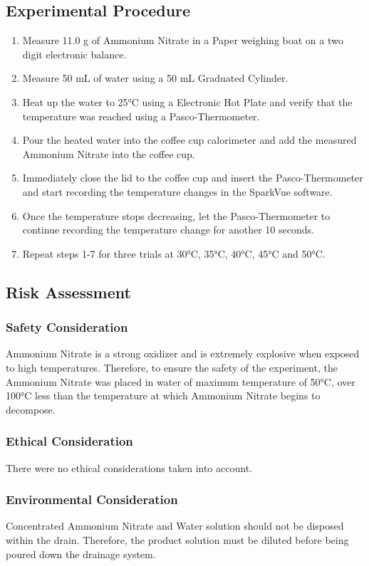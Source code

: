 \documentclass{article}
\begin{document}
\subsection{Experimental Procedure}
\begin{enumerate}
    \item Measure 11.0 g of Ammonium Nitrate in a Paper weighing boat on a two digit electronic balance. 
    \item Measure 50 mL of water using a 50 mL Graduated Cylinder.
    \item Heat up the water to 25°C using a Electronic Hot Plate and verify that the temperature was reached using a Pasco-Thermometer.
    \item Pour the heated water into the coffee cup calorimeter and add the measured Ammonium Nitrate into the coffee cup.
    \item Immediately close the lid to the coffee cup and insert the Pasco-Thermometer and start recording the temperature changes in the SparkVue software.
    \item Once the temperature stops decreasing, let the Pasco-Thermometer to continue recording the temperature change for another 10 seconds.
    \item Repeat steps 1-7 for three trials at 30°C, 35°C, 40°C, 45°C and 50°C.
\end{enumerate}

\subsection{Risk Assessment}
\subsubsection{Safety Consideration}
Ammonium Nitrate is a strong oxidizer and is extremely explosive when exposed to high temperatures. Therefore, to ensure the safety of the experiment, the Ammonium Nitrate was placed in water of maximum temperature of 50°C, over 100°C less than the temperature at which Ammonium Nitrate begins to decompose. 
\subsubsection{Ethical Consideration}
There were no ethical considerations taken into account.
\subsubsection{Environmental Consideration}
Concentrated Ammonium Nitrate and Water solution should not be disposed within the drain. Therefore, the product solution must be diluted before being poured down the drainage system.
\end{document}
